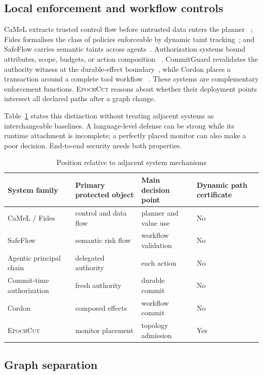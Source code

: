 \documentclass[10pt,journal,compsoc]{IEEEtran}
\newcommand{\system}{\textsc{EpochCut}}
\begin{document}
\subsection{Local enforcement and workflow controls}

CaMeL extracts trusted control flow before untrusted data enters the planner
~\cite{debenedetti2025camel}; Fides formalises the class of policies enforceable
by dynamic taint tracking~\cite{costa2025ifc}; and SafeFlow carries semantic
taints across agents~\cite{dai2026safeflow}.  Authorization systems bound
attributes, scope, budgets, or action composition
~\cite{luo2026agentguard,muruaga2026bounded}.  CommitGuard revalidates the
authority witness at the durable-effect boundary~\cite{santos2026commit}, while
Cordon places a transaction around a complete tool workflow
~\cite{chen2026cordon}.  These systems are complementary enforcement functions.
\system{} reasons about whether their deployment points intersect all declared
paths after a graph change.

Table~\ref{tab:position} states this distinction without treating adjacent
systems as interchangeable baselines.  A language-level defense can be strong
while its runtime attachment is incomplete; a perfectly placed monitor can
also make a poor decision.  End-to-end security needs both properties.

\begin{table}[t]
\caption{Position relative to adjacent system mechanisms}
\label{tab:position}
\centering
\footnotesize
\begin{tabular}{llll}
\toprule
System family & Primary protected object & Main decision point & Dynamic path certificate \\
\midrule
CaMeL / Fides & control and data flow & planner and value use & No \\
SafeFlow & semantic risk flow & workflow validation & No \\
Agentic principal chain & delegated authority & each action & No \\
Commit-time authorization & fresh authority & durable commit & No \\
Cordon & composed effects & workflow commit & No \\
\system & monitor placement & topology admission & Yes \\
\bottomrule
\end{tabular}
\end{table}

\subsection{Graph separation}
\end{document}
